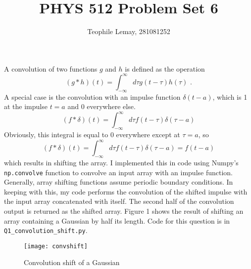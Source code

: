 \documentclass{article}
\title{PHYS 512 Problem Set 6}
\author{Teophile Lemay, 281081252}
\date{}
\newcommand{\<}[1]{\left\langle #1 \right\rangle }
\begin{document}
\maketitle

\section{}
A convolution of two functions $g$ and $h$ is defined as the operation
\[(g * h)(t) = \int_{-\infty}^{\infty}d\tau g(t-\tau)h(\tau) \text{ .}\]
A special case is the convolution with an impulse function $\delta(t-a)$, which is 1 at the impulse $t=a$ and 0 everywhere else.
\[(f*\delta)(t) = \int_{-\infty}^{\infty}d\tau f(t-\tau)\delta(\tau-a)\]
Obviously, this integral is equal to 0 everywhere except at $\tau= a$, so
\[(f*\delta)(t) = \int_{-\infty}^{\infty}d\tau f(t-\tau)\delta(\tau-a) = f(t-a)\]
which results in shifting the array. I implemented this in code using Numpy's \texttt{np.convolve} function to convolve an input array with an impulse function. Generally, array shifting functions assume periodic boundary conditions. In keeping with this, my code performs the convolution of the shifted impulse with the input array concatenated with itself. The second half of the convolution output is returned as the shifted array. Figure 1 shows the result of shifting an array containing a Gaussian by half its length. Code for this question is in \texttt{Q1\_convolution\_shift.py}.
\begin{figure}[h]
	\caption{Convolution shift of a Gaussian}
	\centering
	\texttt{[image: convshift]}
\end{figure}

\section{}

	
	
\end{document}
